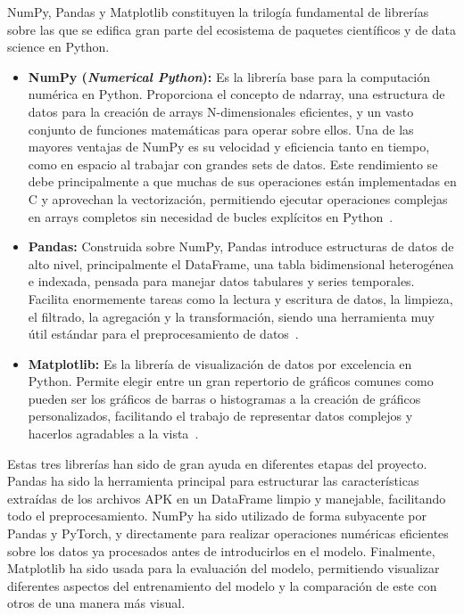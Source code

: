 NumPy, Pandas y Matplotlib constituyen la trilogía fundamental de librerías sobre las que se edifica gran parte del ecosistema de paquetes científicos y de data science en Python.

\begin{itemize}
	\item \textbf{NumPy (\textit{Numerical Python}):} Es la librería base para la computación numérica en Python. Proporciona el concepto de ndarray, una estructura de datos para la creación de arrays N-dimensionales eficientes, y un vasto conjunto de funciones matemáticas para operar sobre ellos. Una de las mayores ventajas de NumPy es su velocidad y eficiencia tanto en tiempo, como en espacio al trabajar con grandes sets de datos. Este rendimiento se debe principalmente a que muchas de sus operaciones están implementadas en C y aprovechan la vectorización, permitiendo ejecutar operaciones complejas en arrays completos sin necesidad de bucles explícitos en Python~\cite{numpyRef}.
	
	\item \textbf{Pandas:} Construida sobre NumPy, Pandas introduce estructuras de datos de alto nivel, principalmente el DataFrame, una tabla bidimensional heterogénea e indexada, pensada para manejar datos tabulares y series temporales. Facilita enormemente tareas como la lectura y escritura de datos, la limpieza, el filtrado, la agregación y la transformación, siendo una herramienta muy útil estándar para el preprocesamiento de datos~\cite{pandasRef}.

	\item \textbf{Matplotlib:} Es la librería de visualización de datos por excelencia en Python. Permite elegir entre un gran repertorio de gráficos comunes como pueden ser los gráficos de barras o histogramas a la creación de gráficos personalizados, facilitando el trabajo de representar datos complejos y hacerlos agradables a la vista~\cite{matplotlibRef}.
	
\end{itemize}

Estas tres librerías han sido de gran ayuda en diferentes etapas del proyecto. Pandas ha sido la herramienta principal para estructurar las características extraídas de los archivos APK en un DataFrame limpio y manejable, facilitando todo el preprocesamiento. NumPy ha sido utilizado de forma subyacente por Pandas y PyTorch, y directamente para realizar operaciones numéricas eficientes sobre los datos ya procesados antes de introducirlos en el modelo. Finalmente, Matplotlib ha sido usada para la evaluación del modelo, permitiendo visualizar diferentes aspectos del entrenamiento del modelo y la comparación de este con otros de una manera más visual.

